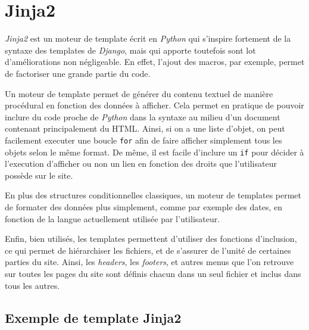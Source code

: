\documentclass[a4paper]{report}
\begin{document}
\section{Jinja2}
\label{sec:jinja2}
\par \emph{Jinja2} est un moteur de template écrit en \emph{Python}  qui s'inspire fortement de la syntaxe des templates de
\emph{Django}, mais qui apporte toutefois sont lot d'améliorations non négligeable. En effet, l'ajout des macros, par
exemple, permet de factoriser une grande partie du code.
\par Un moteur de template permet de générer du contenu textuel de manière procédural en fonction des données à
afficher. Cela permet en pratique de pouvoir inclure du code proche de \emph{Python} dans la syntaxe au milieu d'un
document contenant principalement du HTML. Ainsi, si on a une liste d'objet, on peut facilement executer une boucle
\verb#for# afin de faire afficher simplement tous les objets selon le même format.
\noindent De même, il est facile d'inclure un \verb#if# pour décider à l'execution d'afficher ou non un lien en fonction
des droits que l'utilisateur possède sur le site.
\par En plus des structures conditionnelles classiques, un moteur de templates permet de formater des données plus
simplement, comme par exemple des dates, en fonction de la langue actuellement utilisée par l'utilisateur.
\par Enfin, bien utilisés, les templates permettent d'utiliser des fonctions d'inclusion, ce qui permet de hiérarchiser
les fichiers, et de s'assurer de l'unité de certaines parties du site. Ainsi, les \emph{headers}, les \emph{footers}, et
autres menus que l'on retrouve sur toutes les pages du site sont définis chacun dans un seul fichier et inclus dans
tous les autres.

\subsection{Exemple de template Jinja2}
\label{sub:exemple_de_template_jinja2}
\end{document}
